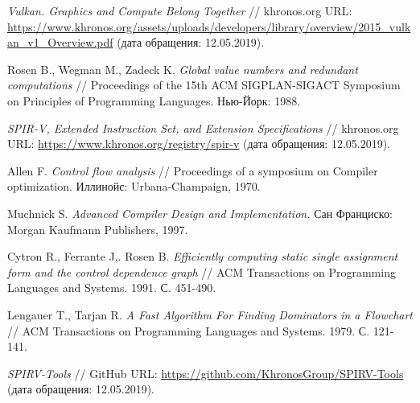 \documentclass[14pt]{extarticle}
\begin{document}
\newpage
{}
\begin{thebibliography}{9}

\textit{Vulkan. Graphics and Compute Belong Together} // khronos.org URL: \url{https://www.khronos.org/assets/uploads/developers/library/overview/2015_vulkan_v1_Overview.pdf} (дата обращения: 12.05.2019).

Rosen B., Wegman M., Zadeck K. 
\textit{Global value numbers and redundant computations} // Proceedings of the 15th ACM SIGPLAN-SIGACT Symposium on Principles of Programming Languages. Нью-Йорк: 1988. 

\textit{SPIR-V, Extended Instruction Set, and Extension Specifications} // khronos.org URL: \url{https://www.khronos.org/registry/spir-v} (дата обращения: 12.05.2019).

Allen F. 
\textit{Control flow analysis} // Proceedings of a symposium on Compiler optimization. Иллинойс: Urbana-Champaign, 1970.

Muchnick S. 
\textit{Advanced Compiler Design and Implementation.} Сан Франциско: Morgan Kaufmann Publishers, 1997.

Cytron R., Ferrante J,. Rosen B. 
\textit{Efficiently computing static single assignment form and the control dependence graph} // ACM Transactions on Programming Languages and Systems. 1991. С. 451-490.

Lengauer T., Tarjan R.
\textit{A Fast Algorithm For Finding Dominators in a Flowchart} // ACM Transactions on Programming Languages and Systems. 1979. С. 121-141.

\textit{SPIRV-Tools} // GitHub URL: \url{https://github.com/KhronosGroup/SPIRV-Tools} (дата обращения: 12.05.2019).

\end{thebibliography}
\end{document}
